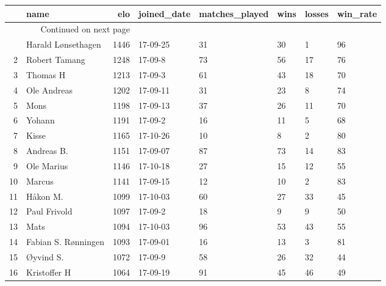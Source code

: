 \begin{longtable}{|r|l|r|l|l|l|l|l|}
\toprule
{} &                 name &   elo & joined\_date &  matches\_played &  wins &  losses &  win\_rate \\
\midrule
\endhead
\midrule
\multicolumn{3}{r}{{Continued on next page}} \\
\midrule
\endfoot

\bottomrule
\endlastfoot
1  &   Harald Lønsethagen &  1446 &    17-09-25 &              31 &    30 &       1 &        96 \\
2  &        Robert Tamang &  1248 &     17-09-8 &              73 &    56 &      17 &        76 \\
3  &             Thomas H &  1213 &     17-09-3 &              61 &    43 &      18 &        70 \\
4  &          Ole Andreas &  1202 &    17-09-11 &              31 &    23 &       8 &        74 \\
5  &                 Mons &  1198 &    17-09-13 &              37 &    26 &      11 &        70 \\
6  &               Yohann &  1191 &     17-09-2 &              16 &    11 &       5 &        68 \\
7  &                Kisse &  1165 &    17-10-26 &              10 &     8 &       2 &        80 \\
8  &           Andreas B. &  1151 &    17-09-07 &              87 &    73 &      14 &        83 \\
9  &           Ole Marius &  1146 &    17-10-18 &              27 &    15 &      12 &        55 \\
10 &               Marcus &  1141 &    17-09-15 &              12 &    10 &       2 &        83 \\
11 &             Håkon M. &  1099 &    17-10-03 &              60 &    27 &      33 &        45 \\
12 &         Paul Frivold &  1097 &     17-09-2 &              18 &     9 &       9 &        50 \\
13 &                 Mats &  1094 &    17-10-03 &              96 &    53 &      43 &        55 \\
14 &  Fabian S. Rønningen &  1093 &    17-09-01 &              16 &    13 &       3 &        81 \\
15 &            Øyvind S. &  1072 &     17-09-9 &              58 &    26 &      32 &        44 \\
16 &         Kristoffer H &  1064 &    17-09-19 &              91 &    45 &      46 &        49 \\

\end{longtable}
